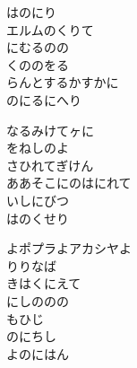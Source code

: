 \documentclass[10pt,b5j]{tarticle} %
\begin{document}
\begin{enumerate}
\begin{minipage}[c]{\blocksize}
        \vspace{\linespace}
        \item
        はのにり\\
        エルムのくりて\\
        にむるのの\\
        くののをる\\
        らんとするかすかに\\
        のにるにへり
        
        \vspace{\linespace}
        \item
        なるみけてヶに\\
        をねしのよ\\
        さひれてぎけん\\
        ああそこにのはにれて\\
        いしにびつ\\
        はのくせり
        
        \vspace{\linespace}
        \item
        よポプラよアカシヤよ\\
        りりなば\\
        きはくにえて\\
        にしののの\\
        もひじ\\
        のにちし\\
        よのにはん
    
    \end{minipage}
\end{enumerate} %
\end{document}
